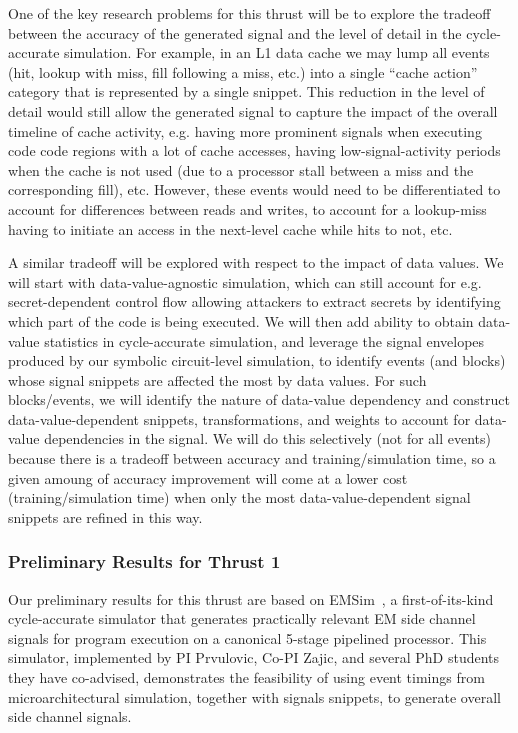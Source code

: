 One of the key research problems for this thrust will be to explore the tradeoff between the accuracy of the generated signal and the level of detail in the cycle-accurate simulation.
For example, in an L1 data cache we may lump all events (hit, lookup with miss, fill following a miss, etc.) into a single ``cache action''  category that is represented by a single snippet. This reduction in the level of detail would still allow the generated signal to capture the impact of the overall timeline of cache activity, e.g. having more prominent signals when executing code code regions with a lot of cache accesses, having low-signal-activity periods when the cache is not used (due to a processor stall between a miss and the corresponding fill), etc. However, these events would need to be differentiated to account for differences between reads and writes, to account for a lookup-miss having to initiate an access in the next-level cache while hits to not, etc.

A similar tradeoff will be explored with respect to the impact of data values.
We will start with data-value-agnostic simulation, which can still account for 
 e.g. secret-dependent control flow allowing attackers to
 extract secrets by identifying which part of the code is being executed.
We will then add ability to obtain data-value statistics in cycle-accurate simulation,
and leverage the signal envelopes produced by our symbolic circuit-level simulation, to identify events (and blocks) whose signal snippets are affected the most by data values.
For such blocks/events, we will identify the nature of data-value dependency and construct data-value-dependent snippets, transformations, and weights to account for data-value dependencies in the signal. We will do this selectively (not for all events) because there is a tradeoff between accuracy and training/simulation time, so a given amoung of accuracy improvement will come at a lower cost (training/simulation time) when only the most data-value-dependent signal snippets are refined in this way.

\subsubsection{Preliminary Results for Thrust 1}

Our preliminary results for this thrust are based on EMSim~\cite{Nader2020}, a first-of-its-kind cycle-accurate simulator that generates practically relevant EM side channel signals for program execution on a canonical 5-stage pipelined processor. This simulator,
implemented by PI Prvulovic, Co-PI Zajic, and several PhD students they have co-advised, demonstrates the feasibility of using event timings from microarchitectural simulation, together with signals snippets, to generate overall side channel signals.

